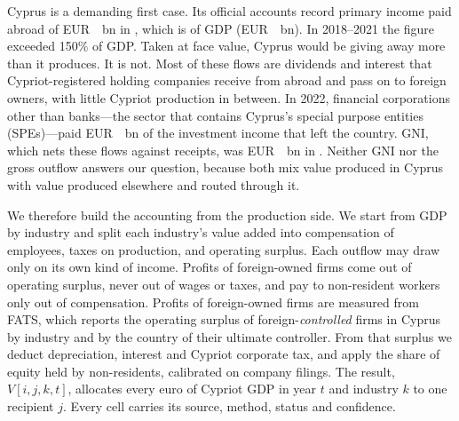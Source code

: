 \documentclass[11pt]{article}
\newcommand{\EUR}{EUR~}
\begin{document}
Cyprus is a demanding first case.
Its official accounts record primary income paid abroad of \EUR\OfficialOutLastEUR~bn in \LastYear{}, which is \OfficialOutLast{} of GDP (\EUR\GDPLast~bn).
In 2018--2021 the figure exceeded 150\% of GDP.
Taken at face value, Cyprus would be giving away more than it produces.
It is not.
Most of these flows are dividends and interest that Cypriot-registered holding companies receive from abroad and pass on to foreign owners, with little Cypriot production in between.
In 2022, financial corporations other than banks---the sector that contains Cyprus's special purpose entities (SPEs)---paid \EUR\OFCPaidTwentyTwo~bn of the investment income that left the country.
GNI, which nets these flows against receipts, was \EUR\GNILastEUR~bn in \LastYear{}.
Neither GNI nor the gross outflow answers our question, because both mix value produced in Cyprus with value produced elsewhere and routed through it.

We therefore build the accounting from the production side.
We start from GDP by industry and split each industry's value added into compensation of employees, taxes on production, and operating surplus.
Each outflow may draw only on its own kind of income.
Profits of foreign-owned firms come out of operating surplus, never out of wages or taxes, and pay to non-resident workers only out of compensation.
Profits of foreign-owned firms are measured from FATS, which reports the operating surplus of foreign-\emph{controlled} firms in Cyprus by industry and by the country of their ultimate controller.
From that surplus we deduct depreciation, interest and Cypriot corporate tax, and apply the share of equity held by non-residents, calibrated on company filings.
The result, $V[i,j,k,t]$, allocates every euro of Cypriot GDP in year $t$ and industry $k$ to one recipient $j$.
Every cell carries its source, method, status and confidence.
\end{document}
